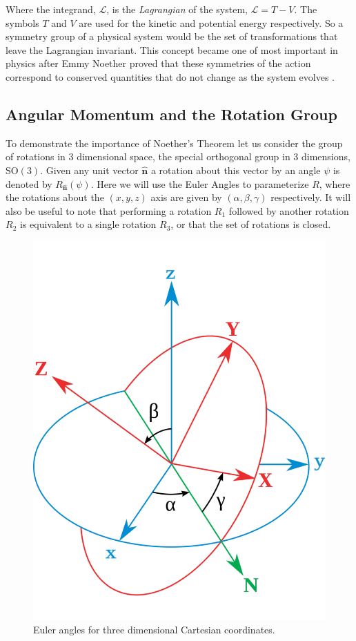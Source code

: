 Where the integrand, $\mathscr{L}$, is the \textit{Lagrangian} of the system, $\mathscr{L} = T - V$. The symbols $T$ and $V$ are used for the kinetic and potential energy respectively. So a symmetry group of a physical system would be the set of transformations that leave the Lagrangian invariant. This concept became one of most important in physics after Emmy Noether proved that these symmetries of the action correspond to conserved quantities that do not change as the system evolves \cite{Noether:1918zz}.

\subsection{Angular Momentum and the Rotation Group}
\label{sec:AngularMomentum}

To demonstrate the importance of Noether's Theorem let us consider the group of rotations in 3 dimensional space, the special orthogonal group in 3 dimensions, $\mathrm{SO}(3)$. Given any unit vector $\hat{\textbf{n}}$ a rotation about this vector by an angle $\psi$ is denoted by $R_{\hat{\textbf{n}}}(\psi)$. Here we will use the Euler Angles to parameterize $R$, where the rotations about the $(x,y,z)$ axis are given by $(\alpha, \beta, \gamma)$ respectively. It will also be useful to note that performing a rotation $R_{1}$ followed by another rotation $R_{2}$ is equivalent to a single rotation $R_{3}$, or that the set of rotations is closed.

\begin{figure}
\label{fig:Euler}
\begin{center}
\includegraphics[width=0.5\linewidth]{Introduction/Euler.pdf}
\caption{Euler angles for three dimensional Cartesian coordinates.\cite{wiki:Euler}}
\end{center}
\end{figure}


